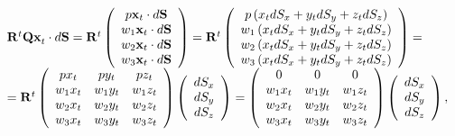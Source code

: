 \begin{equation*}
  \label{9}
  \begin{array}{l}
   {\bf{R}}^t {\bf{Qx}}_t  \cdot d{\bf{S}} = {\bf{R}}^t \left( {\begin{array}{*{20}c}
     {p{\bf{x}}_t  \cdot d{\bf{S}}}  \\
     {w_1 {\bf{x}}_t  \cdot d{\bf{S}}}  \\
     {w_2 {\bf{x}}_t  \cdot d{\bf{S}}}  \\
     {w_3 {\bf{x}}_t  \cdot d{\bf{S}}}  \\
  \end{array}} \right) = {\bf{R}}^t \left( {\begin{array}{*{20}c}
     {p\left( {x_t dS_x  + y_t dS_y  + z_t dS_z } \right)}  \\
     {w_1 \left( {x_t dS_x  + y_t dS_y  + z_t dS_z } \right)}  \\
     {w_2 \left( {x_t dS_x  + y_t dS_y  + z_t dS_z } \right)}  \\
     {w_3 \left( {x_t dS_x  + y_t dS_y  + z_t dS_z } \right)}  \\
  \end{array}} \right) =  \\
    = {\bf{R}}^t \left( {\begin{array}{*{20}c}
     {px_t } & {py_t } & {pz_t }  \\
     {w_1 x_t } & {w_1 y_t } & {w_1 z_t }  \\
     {w_2 x_t } & {w_2 y_t } & {w_2 z_t }  \\
     {w_3 x_t } & {w_3 y_t } & {w_3 z_t }  \\
  \end{array}} \right)\left( {\begin{array}{*{20}c}
     {dS_x }  \\
     {dS_y }  \\
     {dS_z }  \\
  \end{array}} \right) = \left( {\begin{array}{*{20}c}
     0 & 0 & 0  \\
     {w_1 x_t } & {w_1 y_t } & {w_1 z_t }  \\
     {w_2 x_t } & {w_2 y_t } & {w_2 z_t }  \\
     {w_3 x_t } & {w_3 y_t } & {w_3 z_t }  \\
  \end{array}} \right)\left( {\begin{array}{*{20}c}
     {dS_x }  \\
     {dS_y }  \\
     {dS_z }  \\
  \end{array}} \right), \\
 \end{array}
\end{equation*}
